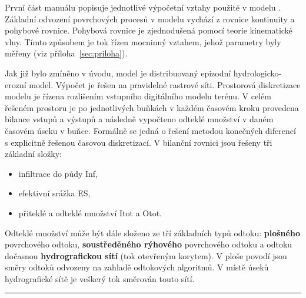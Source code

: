 %

První část manuálu popisuje jednotlivé výpočetní vztahy použité v modelu \smod. Základní odvození povrchových procesů v modelu \smod vychází z rovnice kontinuity a pohybové rovnice. Pohybová rovnice je zjednodušená pomocí teorie kinematické vlny. Tímto způsobem je tok řízen mocninný vztahem, jehož parametry byly měřeny (viz  příloha~\ref{sec:priloha}). 

Jak již bylo zmíněno v úvodu, model \smod je distribuovaný epizodní hydrologicko-erozní model. Výpočet je řešen na pravidelné rastrové síti. Prostorová diskretizace modelu je řízena  rozlišením vstupního digitálního modelu terénu. V celém řešeném prostoru je po jednotlivých buňkách v každém časovém kroku provedena bilance vstupů a výstupů a následně vypočteno odteklé množství v daném časovém úseku v buňce. Formálně se jedná o řešení metodou konečných diferencí s explicitně řešenou časovou diskretizací. V bilanční rovnici jsou řešeny tři základní složky:


\begin{itemize}\itemsep 0cm
\item infiltrace do půdy \acs{Inf},
\item efektivní srážka \acs{ES},
\item přiteklé a odteklé množství \acs{Itot} a \acs{Otot}.
\end{itemize}


Odteklé množství může být dále složeno ze tří základních typů odtoku: \textbf{plošného} povrchového odtoku, \textbf{soustředěného rýhového} povrchového odtoku a odtoku dočasnou \textbf{hydrografickou sítí} (tok otevřeným korytem). V ploše povodí jsou směry odtoků odvozeny na zahladě odtokových algoritmů. V místě úseků hydrografické sítě je veškerý tok směrován touto sítí.\\
% 
% 
\rule{\textwidth}{0.3pt}



